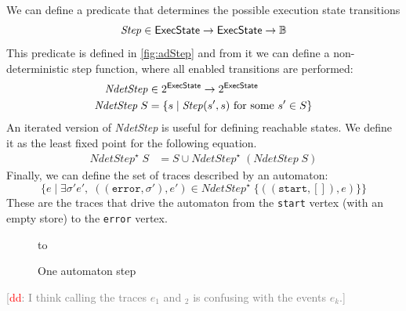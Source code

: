\documentclass[10pt]{llncs} %
\newcommand{\noterg}[2]{\textcolor{gray}{[\textcolor{red}{#1}: #2]}}
\newcommand{\rg}[1]{\noterg{rg}{#1}}
\newcommand{\rlp}[1]{\noterg{rlp}{#1}}
\newcommand{\dd}[1]{\noterg{dd}{#1}}
\newcommand{\dinocomment}[1]{\dd{#1}}
\newcommand{\B}{\ensuremath{\mathbb{B}}}
\newcommand{\set}[1]{\ensuremath{\mathsf{#1}}}
\begin{document}
We can define a predicate that determines the possible execution state transitions
\[
\mathit{Step} \in \set{\World}\to\set{\World} \to \B
\]
This predicate is defined in \autoref{fig:adStep} and 
from it we can define a non-deterministic step function, where all
enabled transitions are performed:
\begin{align}
\mathit{NdetStep}&\in 2^{\set{\World}} \to 2^{\set{\World}}\\
\mathit{NdetStep}\;S&=\{ s \mid \text{$\mathit{Step}(s', s)$ for some $s'\in S$} \} \label{eq:ndetstep}
\end{align}
An iterated version of \textit{NdetStep} is useful for defining reachable states.
We define it as the least fixed point for the following equation.
\begin{align}
\mathit{NdetStep}^\star\;S &= S \cup \mathit{NdetStep}^\star\;(\mathit{NdetStep}\;S)
\end{align}
Finally, we can define the set of traces described by an automaton:
\[
\{ e \mid
\exists\sigma'e',\;((\mathtt{error},\sigma'),e')\in\mathit{NdetStep}^\star\;\{((\mathtt{start},[]),e)\}
\}
\]
These are the traces that drive the automaton from the \texttt{start} vertex (with an empty store) to the \texttt{error} vertex.
\begin{figure}
\hbox to
\caption{One automaton step}
\label{fig:adStep}
\end{figure}
\dinocomment{I think calling the traces $e_1$ and $_2$ is confusing with the events $e_k$.}
\end{document}
